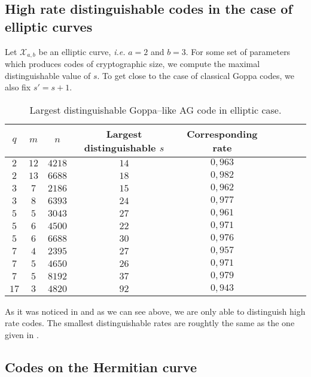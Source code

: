 \documentclass[a4paper]{amsart}
\theoremstyle{definition}
\theoremstyle{remark}
\newcommand{\calX}{\mathcal{X}}
\begin{document}
\subsection{High rate distinguishable codes in the case of elliptic curves}

Let $\calX_{a,b}$ be an elliptic curve, \emph{i.e.} $a=2$ and $b=3$. For some set of parameters which produces codes of cryptographic size, we compute the maximal distinguishable value of $s$. To get close to the case of classical Goppa codes, we also fix $s'=s+1$.
\begin{table}[h]
\begin{center}
\begin{tabular}{|c|c|c||c|c|c|c|c|c|}
    \hline
    $q$ & $m$ & $n$ & Largest distinguishable $s$ & Corresponding rate\\
    \hline \hline
     $2$ & $12$ & $4218$ & $14$ & $0,963$ \\
    \hline 
     $2$ & $13$ & $6688$ & $18$ & $0,982$  \\
    \hline \hline
     $3$ & $7$ & $2186$ & $15$ & $0,962$ \\
    \hline
     $3$ & $8$ & $6393$ & $24$ & $0,977$ \\
    \hline \hline
     $5$ & $5$ & $3043$ & $27$ & $0,961$  \\
    \hline
     $5$ & $6$ & $4500$ & $22$ & $0,971$ \\
    \hline
     $5$  & $6$ & $6688$ & $30$ & $0,976$ \\
    \hline \hline
     $7$ & $4$ & $2395$ & $27$ & $0,957$ \\
    \hline
      $7$ & $5$ & $4650$ & $26$ & $0,971$ \\
    \hline
      $7$ & $5$ & $8192$ & $37$ & $0,979$ \\
    \hline \hline
      $17$ & $3$ & $4820$ & $92$ & $0,943$ \\
    \hline
\end{tabular}
\vspace*{0.3em}
\caption{Largest distinguishable Goppa--like AG code in elliptic case.}
\end{center}
\end{table}

As it was noticed in \cite{MT21} and as we can see above, we are only able to distinguish high rate codes. The smallest distinguishable rates are roughtly the same as the one given in \cite{MT21}. 

\subsection{Codes on the Hermitian curve}
\end{document}

